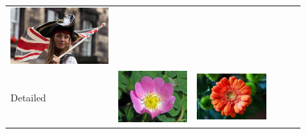 \begin{figure}
\begin{minipage}[t]{\textwidth}
\begin{tabular}{m{.01\linewidth} m{.16\linewidth} m{.16\linewidth} m{.16\linewidth} m{.16\linewidth} m{.16\linewidth}}
    \includegraphics[width=\linewidth]{../style/figures/flickr_on_flickr/pred_style_Depth_of_Field/4.jpg} \\
    \begin{turn}{90}\small{Detailed}\end{turn} &
    \includegraphics[width=\linewidth]{../style/figures/flickr_on_flickr/pred_style_Detailed/0.jpg} &
    \includegraphics[width=\linewidth]{../style/figures/flickr_on_flickr/pred_style_Detailed/1.jpg} &

\end{tabular}
\end{minipage}
\end{figure}
